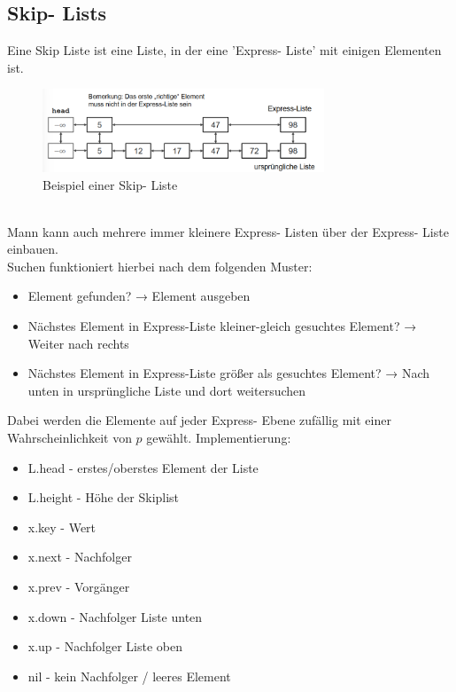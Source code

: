 \documentclass{article}
\begin{document}
        \subsection{Skip- Lists}
            Eine Skip Liste ist eine Liste, in der eine 'Express- Liste' mit einigen Elementen ist.\\
            \begin{figure}[ht]
                \centering
                \includegraphics[width=0.75\textwidth]{Bilder/Skip.png}
                \caption{Beispiel einer Skip- Liste}
                \label{fig:Skip}
            \end{figure}\\
            Mann kann auch mehrere immer kleinere Express- Listen über der Express- Liste einbauen.\\
            Suchen funktioniert hierbei nach dem folgenden Muster:
            \begin{itemize}
                \item Element gefunden? → Element ausgeben
                \item Nächstes Element in Express-Liste kleiner-gleich gesuchtes Element? → Weiter nach rechts
                \item Nächstes Element in Express-Liste größer als gesuchtes Element? → Nach unten in ursprüngliche Liste und dort weitersuchen
            \end{itemize}
            Dabei werden die Elemente auf jeder Express- Ebene zufällig mit einer Wahrscheinlichkeit von $p$ gewählt.
            Implementierung:
            \begin{itemize}
                \item L.head - erstes/oberstes Element der Liste
                \item L.height - Höhe der Skiplist
                \item x.key - Wert
                \item x.next - Nachfolger
                \item x.prev - Vorgänger
                \item x.down - Nachfolger Liste unten
                \item x.up - Nachfolger Liste oben
                \item nil - kein Nachfolger / leeres Element
            \end{itemize}
\end{document}
